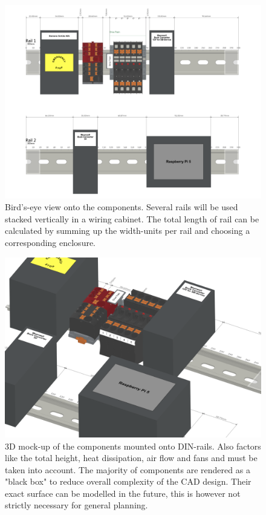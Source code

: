     \begin{figure}[h!] %
        \centering
        \includegraphics[width=1\linewidth]{contents/figures/bird-view_rails.png}
        \caption{Bird's-eye view onto the components. Several rails will be used stacked vertically in a wiring cabinet. The total length of rail can be calculated by summing up the width-units per rail and choosing a corresponding enclosure.}
        \label{bird-cad}
    \end{figure}

    \clearpage %

    \begin{figure}[h!] %
        \vspace{1cm}
        \includegraphics[width=1\linewidth]{contents/figures/diagonal-view_rails.png}
        \caption{3D mock-up of the components mounted onto DIN-rails. Also factors like the total height, heat dissipation, air flow and fans and must be taken into account. The majority of components are rendered as a "black box" to reduce overall complexity of the CAD design. Their exact surface can be modelled in the future, this is however not strictly necessary for general planning.}
        \label{diagonal-cad}
    \end{figure}

